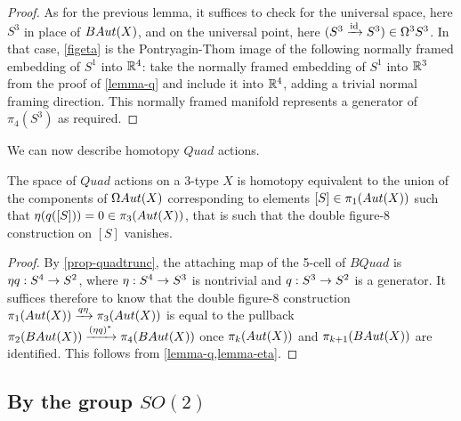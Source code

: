 \documentclass{amsart}
\begin{document}
\begin{proof}
As for the previous lemma, it suffices to check for the universal space, here $S^3$ in place of $BAut(X)$, and on the universal point, here $(S^3 \xrightarrow{\mathrm{id}} S^3) \in \Omega^3 S^3$.  In that case, \cref{figeta} is the Pontryagin-Thom image of the following normally framed embedding of $S^1$ into $\mathbb R^4$: take the normally framed embedding of $S^1$ into $\mathbb R^3$ from the proof of \cref{lemma-q} and include it into $\mathbb R^4$, adding a trivial normal framing direction.  This normally framed manifold represents a generator of $\pi_4(S^3)$ as required.
\end{proof}

We can now describe homotopy $Quad$ actions.

\begin{proposition} 
\label{prop-quadaction}
The space of $Quad$ actions on a 3-type $X$ is homotopy equivalent to the union of the components of $\Omega Aut(X)$ corresponding to elements $[S] \in \pi_1(Aut(X))$ such that $\eta(q([S])) = 0 \in \pi_3(Aut(X))$, that is such that the double figure-8 construction on $[S]$ vanishes.
\end{proposition}
\begin{proof}
By \cref{prop-quadtrunc}, the attaching map of the 5-cell of $BQuad$ is $\eta q: S^4 \rightarrow S^2$, where $\eta : S^4 \rightarrow S^3$ is nontrivial and $q: S^3 \rightarrow S^2$ is a generator.  It suffices therefore to know that the double figure-8 construction $\pi_1(Aut(X)) \xrightarrow{q \eta} \pi_3(Aut(X))$ is equal to the pullback $\pi_2(BAut(X)) \xrightarrow{(\eta q)^\ast} \pi_4(BAut(X))$ once $\pi_{k}(Aut(X))$ and $\pi_{k+1}(BAut(X))$ are identified.  This follows from \cref{lemma-q,lemma-eta}.
\end{proof}



\subsection{By the group $SO(2)$}
\end{document}
